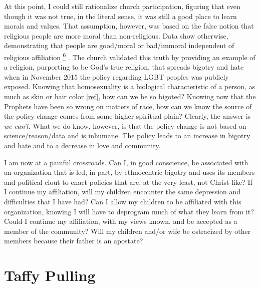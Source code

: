 \documentclass[a4paper]{article}
\providecommand*{\DUfootnotemark}[3]{%
  \raisebox{1em}{\hypertarget{#1}{}}%
  \hyperlink{#2}{\textsuperscript{#3}}%
}
\begin{document}
At this point, I could still rationalize church participation, figuring that even though it was not \textquotedbl{}true\textquotedbl{}, in the literal sense, it was still a good place to learn morals and values.  That assumption, however, was based on the false notion that religious people are more \textquotedbl{}moral\textquotedbl{} than non-religious.  Data show otherwise, demonstrating that people are good/moral or bad/immoral independent of religious affiliation\DUfootnotemark{id8}{id17}{6}.  The church validated this truth by providing an example of a religion, purporting to be God's true religion, that spreads bigotry and hate when in November 2015 the policy regarding LGBT peoples was publicly exposed.  Knowing that homosexuality is a biological characteristic of a person, as much as skin or hair color \hyperlink{ref}{[ref]}, how can we be so bigoted?  Knowing now that the Prophets have been so wrong on matters of race, how can we know the source of the policy change comes from some higher spiritual plain?  Clearly, the answer is \emph{we can't}.  What we do know, however, is that the policy change is not based on science/reason/data and is inhumane.  The policy leads to an increase in bigotry and hate and to a decrease in love and community.

I am now at a painful crossroads.  Can I, in good conscience, be associated with an organization that is led, in part, by ethnocentric bigotry and uses its members and political clout to enact policies that are, at the very least, not Christ-like?  If I continue my affiliation, will my children encounter the same depression and difficulties that I have had?  Can I allow my children to be affiliated with this organization, knowing I will have to deprogram much of what they learn from it?  Could I continue my affiliation, with my views known, and be accepted as a member of the community?  Will my children and/or wife be ostracized by other members because their father is an \textquotedbl{}apostate\textquotedbl{}?


\section{Taffy Pulling%
  \label{taffy-pulling}%
}
\end{document}
